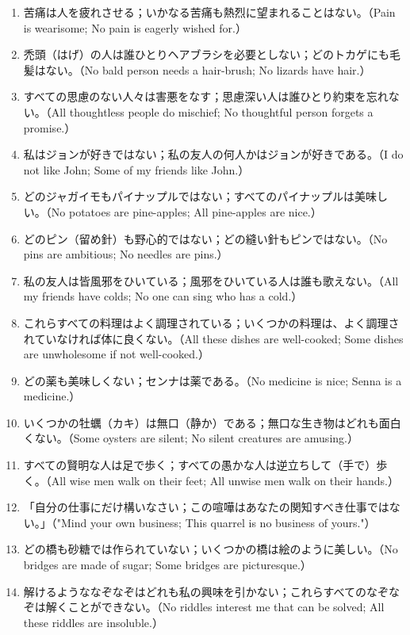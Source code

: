 \documentclass[a4paper,11pt,openany]{ltjsbook}
\begin{document}
\begin{enumerate}[label=\textbf{\arabic*.}]
\item 苦痛は人を疲れさせる；いかなる苦痛も熱烈に望まれることはない。（Pain is wearisome; No pain is eagerly wished for.）
\item 禿頭（はげ）の人は誰ひとりヘアブラシを必要としない；どのトカゲにも毛髪はない。（No bald person needs a hair-brush; No lizards have hair.）
\item すべての思慮のない人々は害悪をなす；思慮深い人は誰ひとり約束を忘れない。（All thoughtless people do mischief; No thoughtful person forgets a promise.）
\item 私はジョンが好きではない；私の友人の何人かはジョンが好きである。（I do not like John; Some of my friends like John.）
\item どのジャガイモもパイナップルではない；すべてのパイナップルは美味しい。（No potatoes are pine-apples; All pine-apples are nice.）
\item どのピン（留め針）も野心的ではない；どの縫い針もピンではない。（No pins are ambitious; No needles are pins.）
\item 私の友人は皆風邪をひいている；風邪をひいている人は誰も歌えない。（All my friends have colds; No one can sing who has a cold.）
\item これらすべての料理はよく調理されている；いくつかの料理は、よく調理されていなければ体に良くない。（All these dishes are well-cooked; Some dishes are unwholesome if not well-cooked.）
\item どの薬も美味しくない；センナは薬である。（No medicine is nice; Senna is a medicine.）
\item いくつかの牡蠣（カキ）は無口（静か）である；無口な生き物はどれも面白くない。（Some oysters are silent; No silent creatures are amusing.）
\item すべての賢明な人は足で歩く；すべての愚かな人は逆立ちして（手で）歩く。（All wise men walk on their feet; All unwise men walk on their hands.）
\item 「自分の仕事にだけ構いなさい；この喧嘩はあなたの関知すべき仕事ではない。」（"Mind your own business; This quarrel is no business of yours."）
\item どの橋も砂糖では作られていない；いくつかの橋は絵のように美しい。（No bridges are made of sugar; Some bridges are picturesque.）
\item 解けるようななぞなぞはどれも私の興味を引かない；これらすべてのなぞなぞは解くことができない。（No riddles interest me that can be solved; All these riddles are insoluble.）

\end{enumerate}
\end{document}
